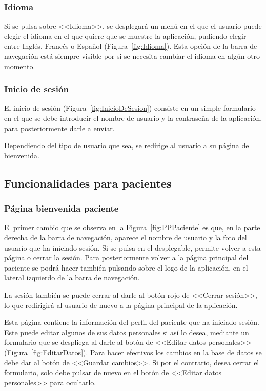     
    \subsubsection{Idioma}
    Si se pulsa sobre <<Idioma>>, se desplegará un menú en el que el usuario puede elegir el idioma en el que quiere que se muestre la aplicación, pudiendo elegir entre Inglés, Francés o Español (Figura~\ref{fig:Idioma}). Esta opción de la barra de navegación está siempre visible por si se necesita cambiar el idioma en algún otro momento.

    
    \subsubsection{Inicio de sesión}
    El inicio de sesión (Figura~\ref{fig:InicioDeSesion}) consiste en un simple formulario en el que se debe introducir el nombre de usuario y la contraseña de la aplicación, para posteriormente darle a enviar.

    Dependiendo del tipo de usuario que sea, se redirige al usuario a su página de bienvenida.

\subsection{Funcionalidades para pacientes}
    \subsubsection{Página bienvenida paciente}
    El primer cambio que se observa en la Figura~\ref{fig:PPPaciente} es que, en la parte derecha de la barra de navegación, aparece el nombre de usuario y la foto del usuario que ha iniciado sesión. Si se pulsa en el desplegable, permite volver a esta página o cerrar la sesión. Para posteriormente volver a la página principal del paciente se podrá hacer también pulsando sobre el logo de la aplicación, en el lateral izquierdo de la barra de navegación.

    La sesión también se puede cerrar al darle al botón rojo de <<Cerrar sesión>>, lo que redirigirá al usuario de nuevo a la página principal de la aplicación.

    Esta página contiene la información del perfil del paciente que ha iniciado sesión. Este puede editar algunos de sus datos personales si así lo desea, mediante un formulario que se despliega al darle al botón de <<Editar datos personales>> (Figura~\ref{fig:EditarDatos}). Para hacer efectivos los cambios en la base de datos se debe dar al botón de <<Guardar cambios>>. Si por el contrario, desea cerrar el formulario, solo debe pulsar de nuevo en el botón de <<Editar datos personales>> para ocultarlo.

